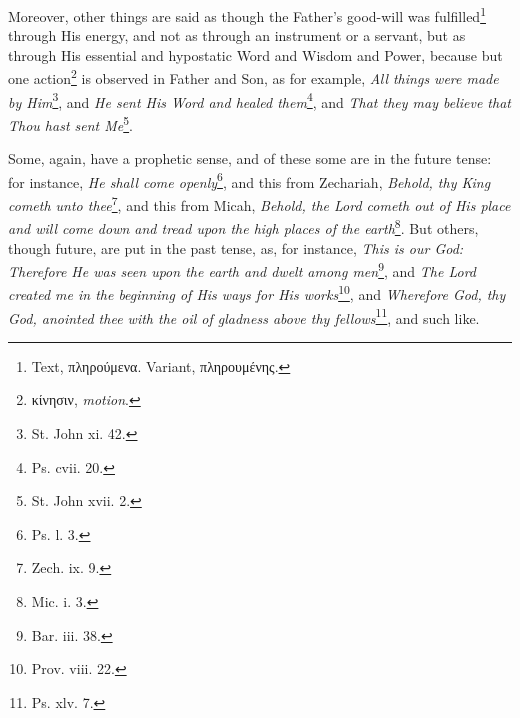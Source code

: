 Moreover, other things are said as though the Father’s good-will was fulfilled\footnote{Text, \textgreek{πληρούμενα}. Variant, \textgreek{πληρουμένης}.} through His energy, and not as through an instrument or a servant, but as through His essential and hypostatic Word and Wisdom and Power, because but one action\footnote{\textgreek{κίνησιν}, \emph{motion}.} is observed in Father and Son, as for example, \emph{All things were made by Him}\footnote{St. John xi. 42.}, and \emph{He sent His Word and healed them}\footnote{Ps. cvii. 20.}, and \emph{That they may believe that Thou hast sent Me}\footnote{St. John xvii. 2.}.

Some, again, have a prophetic sense, and of these some are in the future tense: for instance, \emph{He shall come openly}\footnote{Ps. l. 3.}, and this from Zechariah, \emph{Behold, thy King cometh unto thee}\footnote{Zech. ix. 9.}, and this from Micah, \emph{Behold, the Lord cometh out of His place and will come down and tread upon the high places of the earth}\footnote{Mic. i. 3.}. But others, though future, are put in the past tense, as, for instance, \emph{This is our God: Therefore He was seen upon the earth and dwelt among men}\footnote{Bar. iii. 38.}, and \emph{The Lord created me in the beginning of His ways for His works}\footnote{Prov. viii. 22.}, and \emph{Wherefore God, thy God, anointed thee with the oil of gladness above thy fellows}\footnote{Ps. xlv. 7.}, and such like.

